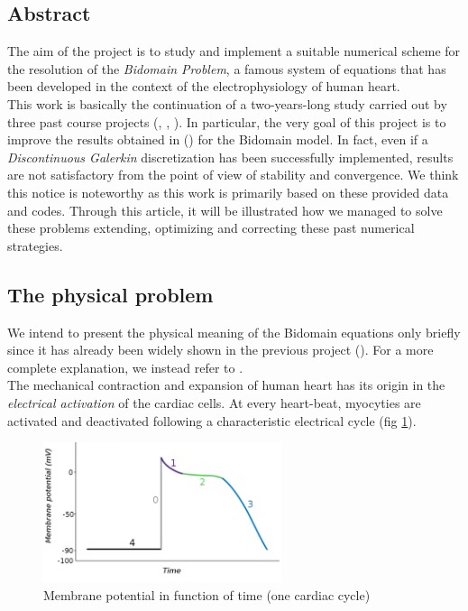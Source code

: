 \documentclass[a4paper,11pt]{article}
\begin{document}
    \subsection{Abstract}
    The aim of the project is to study and implement a suitable numerical scheme for the resolution of the \emph{Bidomain Problem}, a famous system of equations that has been developed in the context of the electrophysiology of human heart. \\
    This work is basically the continuation of a two-years-long study carried out by three past course projects (\cite{bagnara}, \cite{andreotti}, \cite{marta}). In particular, the very goal of this project is to improve the results obtained in \parencite{marta} (\citeauthor{marta}) for the Bidomain model. In fact, even if a \emph{Discontinuous Galerkin} discretization has been successfully implemented, results are not satisfactory from the point of view of stability and convergence. We think this notice is noteworthy as this work is primarily based on these provided data and codes. Through this article, it will be illustrated how we managed to solve these problems extending, optimizing and correcting these past numerical strategies.
    
    \subsection{The physical problem}
    We intend to present the physical meaning of the Bidomain equations only briefly since it has already been widely shown in the previous project (\citeauthor{marta}). For a more complete explanation, we instead refer to \cite{acta}.\\
    The mechanical contraction and expansion of human heart has its origin in the \emph{electrical activation} of the cardiac cells. At every heart-beat, myocyties are activated and deactivated following a characteristic electrical cycle (fig \ref{potential_cycle}). 
    
    
    \begin{figure}[h]
    \begin{center}
    \includegraphics[width = 7cm]{./potential_cycle.png}
    \caption{Membrane potential in function of time (one cardiac cycle)}
    \label{potential_cycle}
    \end{center}
    \end{figure}
    
\end{document}
